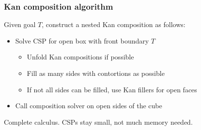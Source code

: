 \documentclass[xetex, mathserif, serif]{beamer}
\begin{document}
\begin{frame}
  \frametitle{Kan composition algorithm}

  Given goal $T$, construct a nested Kan composition as follows:

  \begin{itemize}
  \item Solve CSP for open box with front boundary $T$
    \begin{itemize}
    \item Unfold Kan compositions if possible
    \item Fill as many sides with contortions as possible
    \item If not all sides can be filled, use Kan fillers for open faces
    \end{itemize}
  \item Call composition solver on open sides of the cube
  \end{itemize}

  Complete calculus. CSPs stay small, not much memory needed.
\end{frame}
\end{document}
